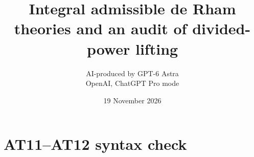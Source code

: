 \documentclass[11pt,a4paper]{article}
\title{Integral admissible de Rham theories and an audit of divided-power lifting}
\author{AI-produced by GPT-6 Astra\\OpenAI, ChatGPT Pro mode}
\date{19 November 2026}
\theoremstyle{definition}
\begin{document}
\section{AT11--AT12 syntax check}



\end{document}

